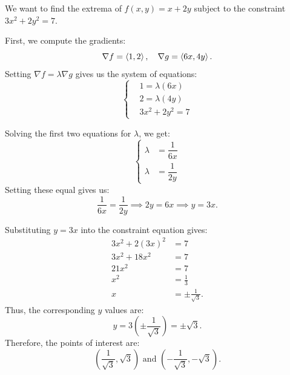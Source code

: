 \begin{example}
We want to find the extrema of $f(x, y) = x + 2y$ subject to the constraint $3x^2 + 2y^2 = 7$.

First, we compute the gradients:
\[
\nabla f = \left\langle 1, 2 \right\rangle, \quad \nabla g = \left\langle 6x, 4y \right\rangle.
\]
Setting $\nabla f = \lambda \nabla g$ gives us the system of equations:
\[
    \left\{
    \begin{aligned}
        &1 = \lambda(6x)\\
        &2 = \lambda(4y)\\
        &3x^2 + 2y^2 = 7
    \end{aligned}
    \right.
\]

Solving the first two equations for $\lambda$, we get:
\[
    \left\{
    \begin{aligned}
        \lambda &= \dfrac{1}{6x} \\
        \lambda &= \dfrac{1}{2y}
    \end{aligned}
    \right.
\]
Setting these equal gives us:
\[
    \dfrac{1}{6x} = \dfrac{1}{2y} \implies 2y = 6x \implies y = 3x.
\]

Substituting $y = 3x$ into the constraint equation gives:
\begin{align*}
    3x^2 + 2(3x)^2 &= 7 \\
    3x^2 + 18x^2 &= 7 \\
    21x^2 &= 7 \\
    x^2 &= \frac{1}{3} \\
    x &= \pm \frac{1}{\sqrt{3}}.
\end{align*}
Thus, the corresponding $y$ values are:
\[
    y = 3\left(\pm \frac{1}{\sqrt{3}}\right) = \pm \sqrt{3}.
\]
Therefore, the points of interest are:
\[\left(\frac{1}{\sqrt{3}}, \sqrt{3}\right) \text{ and } \left(-\frac{1}{\sqrt{3}}, -\sqrt{3}\right).\]
\end{example}

